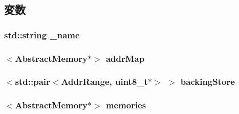 \subsection{変数}
\hypertarget{classPhysicalMemory_aaf2ed934b37cbbd236fdd1b01a5f5005}{
\subsubsection[{\_\-name}]{\setlength{\rightskip}{0pt plus 5cm}std::string {\bf \_\-name}}}
\label{classPhysicalMemory_aaf2ed934b37cbbd236fdd1b01a5f5005}
\hypertarget{classPhysicalMemory_ab5cfae3fb0ca282c337c30f0f36ea8d5}{
\subsubsection[{addrMap}]{$<${\bf AbstractMemory}$\ast$$>$ {\bf addrMap}}}
\label{classPhysicalMemory_ab5cfae3fb0ca282c337c30f0f36ea8d5}
\hypertarget{classPhysicalMemory_a0c347314a9f0b468ed498abaf77bbe44}{
\subsubsection[{backingStore}]{$<${\bf std::pair}$<${\bf AddrRange}, uint8\_\-t$\ast$$>$ $>$ {\bf backingStore}}}
\label{classPhysicalMemory_a0c347314a9f0b468ed498abaf77bbe44}
\hypertarget{classPhysicalMemory_a4c874036afca619454444242943675f4}{
\subsubsection[{memories}]{$<${\bf AbstractMemory}$\ast$$>$ {\bf memories}}}
